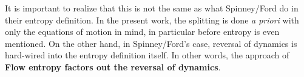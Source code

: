 It is important to realize that this is not the same as what Spinney/Ford do in their entropy definition. In the present work, the splitting is done \emph{a priori} with only the equations of motion in mind, in particular before entropy is even mentioned. On the other hand, in Spinney/Ford's case, reversal of dynamics is hard-wired into the entropy definition itself. In other words, the approach of \textbf{Flow entropy factors out the reversal of dynamics}.